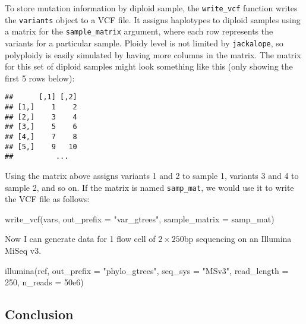\documentclass[12pt,]{article}
\newenvironment{Shaded}{}{}
\newcommand{\DataTypeTok}[1]{#1}
\newcommand{\DecValTok}[1]{#1}
\newcommand{\FloatTok}[1]{#1}
\newcommand{\KeywordTok}[1]{\textcolor[rgb]{0.00,0.00,1.00}{#1}}
\newcommand{\NormalTok}[1]{#1}
\newcommand{\StringTok}[1]{\textcolor[rgb]{0.00,0.50,0.50}{#1}}
\begin{document}
To store mutation information by diploid sample, the \texttt{write\_vcf} function writes
the \texttt{variants} object to a VCF file.
It assigns haplotypes to diploid samples using a matrix for the
\texttt{sample\_matrix} argument, where each row represents the variants for a particular
sample.
Ploidy level is not limited by \texttt{jackalope}, so polyploidy is easily simulated
by having more columns in the matrix.
The matrix for this set of diploid samples might look something like this
(only showing the first 5 rows below):

\begin{verbatim}
##      [,1] [,2]
## [1,]    1    2
## [2,]    3    4
## [3,]    5    6
## [4,]    7    8
## [5,]    9   10
##          ...
\end{verbatim}

Using the matrix above assigns variants 1 and 2 to sample 1, variants 3 and 4 to
sample 2, and so on.
If the matrix is named \texttt{samp\_mat}, we would use it to write the VCF file as follows:

\begin{Shaded}
\begin{Highlighting}[]
\KeywordTok{write_vcf}\NormalTok{(vars, }\DataTypeTok{out_prefix =} \StringTok{"var_gtrees"}\NormalTok{,}
          \DataTypeTok{sample_matrix =}\NormalTok{ samp_mat)}
\end{Highlighting}
\end{Shaded}

Now I can generate data for 1 flow cell of \(2 \times 250\)bp sequencing
on an Illumina MiSeq v3.

\begin{Shaded}
\begin{Highlighting}[]
\KeywordTok{illumina}\NormalTok{(ref, }\DataTypeTok{out_prefix =} \StringTok{"phylo_gtrees"}\NormalTok{, }\DataTypeTok{seq_sys =} \StringTok{"MSv3"}\NormalTok{,}
         \DataTypeTok{read_length =} \DecValTok{250}\NormalTok{, }\DataTypeTok{n_reads =} \FloatTok{50e6}\NormalTok{)}
\end{Highlighting}
\end{Shaded}

\hypertarget{conclusion}{%
\subsection{Conclusion}\label{conclusion}}
\end{document}
